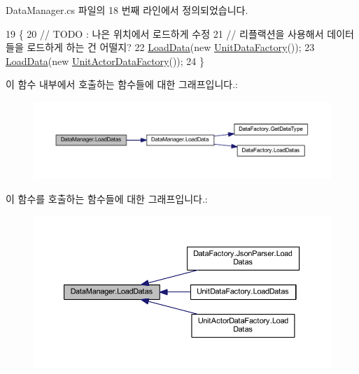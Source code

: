 Data\+Manager.\+cs 파일의 18 번째 라인에서 정의되었습니다.


\begin{DoxyCode}
19     \{
20         \textcolor{comment}{// TODO : 나은 위치에서 로드하게 수정}
21         \textcolor{comment}{// 리플랙션을 사용해서 데이터들을 로드하게 하는 건 어떨지?}
22         \hyperlink{class_data_manager_a458b89dc0fc8d8f2e744ec90e5c43a89}{LoadData}(\textcolor{keyword}{new} \hyperlink{class_unit_data_factory}{UnitDataFactory}());
23         \hyperlink{class_data_manager_a458b89dc0fc8d8f2e744ec90e5c43a89}{LoadData}(\textcolor{keyword}{new} \hyperlink{class_unit_actor_data_factory}{UnitActorDataFactory}());
24     \}
\end{DoxyCode}


이 함수 내부에서 호출하는 함수들에 대한 그래프입니다.\+:\nopagebreak
\begin{figure}[H]
\begin{center}
\leavevmode
\includegraphics[width=350pt]{class_data_manager_a00011c93858e3f4ff45ee740b62a6035_cgraph}
\end{center}
\end{figure}




이 함수를 호출하는 함수들에 대한 그래프입니다.\+:
\nopagebreak
\begin{figure}[H]
\begin{center}
\leavevmode
\includegraphics[width=350pt]{class_data_manager_a00011c93858e3f4ff45ee740b62a6035_icgraph}
\end{center}
\end{figure}




